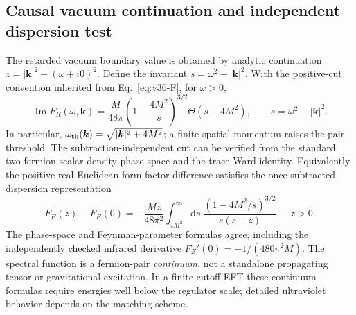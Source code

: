\documentclass[11pt,a4paper]{article}
\theoremstyle{remark}\newtheorem{remark}[theorem]{Remark}
\newcommand{\dd}{\mathrm d}\newcommand{\Tr}{\operatorname{Tr}}\newcommand{\cO}{\mathcal O}\newcommand{\cG}{\mathcal G}\newcommand{\cH}{\mathcal H}\newcommand{\cE}{\mathcal E}\newcommand{\cK}{\mathcal K}\newcommand{\AX}{\textsf{[AXIOM]}}\newcommand{\D}{\textsf{[DERIVED]}}\newcommand{\C}{\textsf{[CONDITIONAL]}}\newcommand{\OPEN}{\textsf{[OPEN]}}
\begin{document}
\subsection{Causal vacuum continuation and independent dispersion test}
The retarded vacuum boundary value is obtained by analytic continuation $z=|\bm k|^2-(\omega+i0)^2$. Define the invariant $s=\omega^2-|\bm k|^2$. With the positive-cut convention inherited from Eq.~\eqref{eq:v36-F}, for $\omega>0$,
\begin{equation}\label{eq:v36-spectral}
\boxed{\operatorname{Im}F_R(\omega,\bm k)=\frac{M}{48\pi}\left(1-\frac{4M^2}{s}\right)^{3/2}\Theta(s-4M^2),\qquad s=\omega^2-|\bm k|^2.}
\end{equation}
In particular, $\omega_{\rm th}(\bm k)=\sqrt{|\bm k|^2+4M^2}$; a finite spatial momentum raises the pair threshold. The subtraction-independent cut can be verified from the standard two-fermion scalar-density phase space and the trace Ward identity. Equivalently the positive-real-Euclidean form-factor difference satisfies the once-subtracted dispersion representation
\begin{equation}\label{eq:v36-disp}
\boxed{F_E(z)-F_E(0)=-\frac{Mz}{48\pi^2}\int_{4M^2}^{\infty}\!\dd s\;\frac{(1-4M^2/s)^{3/2}}{s(s+z)},\quad z>0.}
\end{equation}
The phase-space and Feynman-parameter formulas agree, including the independently checked infrared derivative $F_E'(0)=-1/(480\pi^2M)$. The spectral function is a fermion-pair \emph{continuum}, not a standalone propagating tensor or gravitational excitation. In a finite cutoff EFT these continuum formulas require energies well below the regulator scale; detailed ultraviolet behavior depends on the matching scheme.
\end{document}

